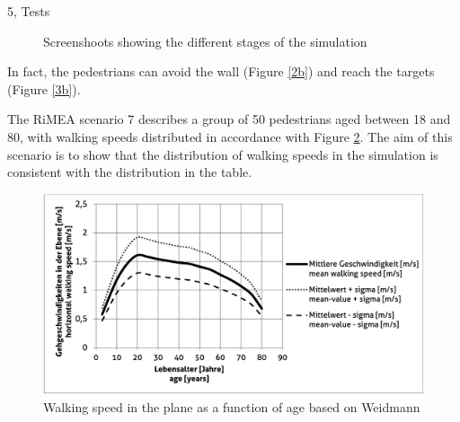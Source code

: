 \documentclass[10pt,a4paper]{article}
\begin{document}
\begin{task}{5, Tests}
\begin{figure} [H]
 \centering
 \caption{Screenshoots showing the different stages of the simulation}
 \label{f3}
\end{figure}

In fact, the pedestrians can avoid the wall (Figure \ref{2b}) and reach the targets (Figure \ref{3b}).


The RiMEA scenario 7 describes a group of 50 pedestrians aged between 18 and 80, with walking speeds distributed in accordance with Figure \ref{fig_sc7}. The aim of this scenario is to show that the distribution of walking speeds in the simulation is consistent with the distribution in the table.

\begin{figure}[H]
    \includegraphics[width=12cm]{images/walking_speed.jpg}
    \centering
    \caption{Walking speed in the plane as a function of age based on Weidmann \cite{weidmann}}
    \label{fig_sc7}
\end{figure}


\end{task}
\end{document}

